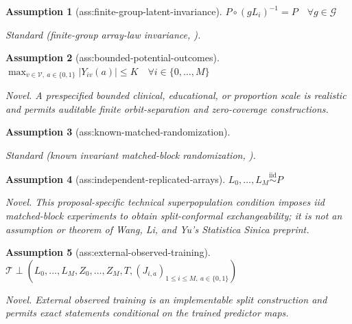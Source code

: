 \documentclass{article}
\newtheorem{assumption}{Assumption}
\begin{document}
\begin{assumption}[ass:finite-group-latent-invariance]\label{ass:finite-group-latent-invariance}
\(P\circ(gL_i)^{-1}=P\quad\forall g\in\mathcal G\)
\par\smallskip\noindent\emph{Standard} (finite-group array-law invariance, \cite{HemerikGoeman2018}).
\end{assumption}

\begin{assumption}[ass:bounded-potential-outcomes]\label{ass:bounded-potential-outcomes}
\(\max_{v\in\mathcal V,\ a\in\{0,1\}}|Y_{iv}(a)|\le K\quad\forall i\in\{0,\ldots,M\}\)
\par\smallskip\noindent\emph{Novel.} A prespecified bounded clinical, educational, or proportion scale is realistic and permits auditable finite orbit-separation and zero-coverage constructions.
\end{assumption}

\begin{assumption}[ass:known-matched-randomization]\label{ass:known-matched-randomization}
\par\noindent {}\par\noindent
\par\smallskip\noindent\emph{Standard} (known invariant matched-block randomization, \cite{BaiLiuShaikhTabordMeehan2024}).
\end{assumption}

\begin{assumption}[ass:independent-replicated-arrays]\label{ass:independent-replicated-arrays}
\(L_0,\ldots,L_M\overset{\mathrm{iid}}{\sim}P\)
\par\smallskip\noindent\emph{Novel.} This proposal-specific technical superpopulation condition imposes iid matched-block experiments to obtain split-conformal exchangeability; it is not an assumption or theorem of Wang, Li, and Yu's Statistica Sinica preprint.
\end{assumption}

\begin{assumption}[ass:external-observed-training]\label{ass:external-observed-training}
\(\mathcal T\perp(L_0,\ldots,L_M,Z_0,\ldots,Z_M,T,(J_{i,a})_{1\le i\le M,\ a\in\{0,1\}})\)
\par\smallskip\noindent\emph{Novel.} External observed training is an implementable split construction and permits exact statements conditional on the trained predictor maps.
\end{assumption}
\end{document}
